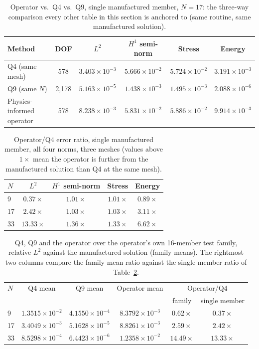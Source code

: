 \documentclass[final,5p,times]{elsarticle}
\begin{document}
\begin{table}[ht]
\centering
\caption{Operator vs.\ Q4 vs.\ Q9, single manufactured member, $N{=}17$:
  the three-way comparison every other table in this section is anchored
  to (same routine, same manufactured solution).}
\label{tab:c1}
\small
\begin{tabular}{lccccc}
\toprule
Method & DOF & $L^2$ & $H^1$ semi-norm & Stress & Energy \\
\midrule
Q4 (same mesh)              & 578   & $3.403\times10^{-3}$ & $5.666\times10^{-2}$ & $5.724\times10^{-2}$ & $3.191\times10^{-3}$ \\
Q9 (same $N$)                & 2{,}178 & $5.163\times10^{-5}$ & $1.438\times10^{-3}$ & $1.495\times10^{-3}$ & $2.088\times10^{-6}$ \\
Physics-informed operator   & 578   & $8.238\times10^{-3}$ & $5.831\times10^{-2}$ & $5.886\times10^{-2}$ & $9.914\times10^{-3}$ \\
\bottomrule
\end{tabular}
\end{table}

\begin{table}[ht]
\centering
\caption{Operator/Q4 error ratio, single manufactured member, all four
  norms, three meshes (values above $1\times$ mean the operator is
  further from the manufactured solution than Q4 at the same mesh).}
\label{tab:c2}
\small
\begin{tabular}{lcccc}
\toprule
$N$ & $L^2$ & $H^1$ semi-norm & Stress & Energy \\
\midrule
9  & $0.37\times$  & $1.01\times$ & $1.01\times$ & $0.89\times$ \\
17 & $2.42\times$  & $1.03\times$ & $1.03\times$ & $3.11\times$ \\
33 & $13.33\times$ & $1.36\times$ & $1.33\times$ & $6.62\times$ \\
\bottomrule
\end{tabular}
\end{table}

\begin{table}[ht]
\centering
\caption{Q4, Q9 and the operator over the operator's own 16-member test
  family, relative $L^2$ against the manufactured solution (family
  means). The rightmost two columns compare the family-mean ratio
  against the single-member ratio of Table~\ref{tab:c2}.}
\label{tab:c3}
\footnotesize
\begin{tabular}{lccccc}
\toprule
$N$ & Q4 mean & Q9 mean & Operator mean & \multicolumn{2}{c}{Operator/Q4} \\
 & & & & family & single member \\
\midrule
9  & $1.3515\times10^{-2}$ & $4.1550\times10^{-4}$ & $8.3792\times10^{-3}$ & $0.62\times$  & $0.37\times$ \\
17 & $3.4049\times10^{-3}$ & $5.1628\times10^{-5}$ & $8.8261\times10^{-3}$ & $2.59\times$  & $2.42\times$ \\
33 & $8.5298\times10^{-4}$ & $6.4423\times10^{-6}$ & $1.2358\times10^{-2}$ & $14.49\times$ & $13.33\times$ \\
\bottomrule
\end{tabular}
\end{table}
\end{document}
